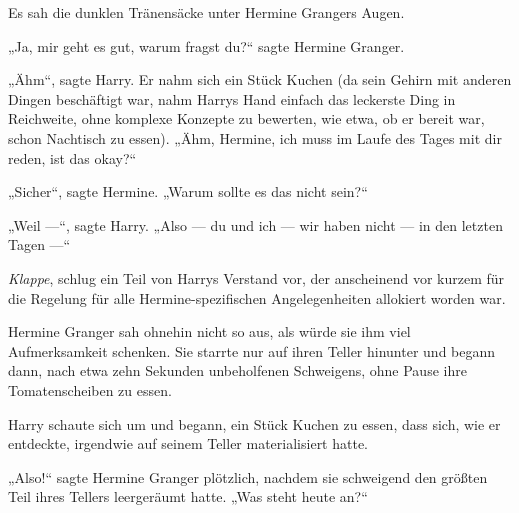 Es sah die dunklen Tränensäcke unter Hermine Grangers Augen.

„Ja, mir geht es gut, warum fragst du?“ sagte Hermine Granger.

„Ähm“, sagte Harry. Er nahm sich ein Stück Kuchen (da sein Gehirn mit anderen Dingen beschäftigt war, nahm Harrys Hand einfach das leckerste Ding in Reichweite, ohne komplexe Konzepte zu bewerten, wie etwa, ob er bereit war, schon Nachtisch zu essen). „Ähm, Hermine, ich muss im Laufe des Tages mit dir reden, ist das okay?“

„Sicher“, sagte Hermine.
„Warum sollte es das nicht sein?“

„Weil —“, sagte Harry.
„Also — du und ich — wir haben nicht — in den letzten Tagen —“

\emph{Klappe}, schlug ein Teil von Harrys Verstand vor, der anscheinend vor kurzem für die Regelung für alle Hermine-spezifischen Angelegenheiten allokiert worden war.

Hermine Granger sah ohnehin nicht so aus, als würde sie ihm viel Aufmerksamkeit schenken. Sie starrte nur auf ihren Teller hinunter und begann dann, nach etwa zehn Sekunden unbeholfenen Schweigens, ohne Pause ihre Tomatenscheiben zu essen.

Harry schaute sich um und begann, ein Stück Kuchen zu essen, dass sich, wie er entdeckte, irgendwie auf seinem Teller materialisiert hatte.

„Also!“ sagte Hermine Granger plötzlich, nachdem sie schweigend den größten Teil ihres Tellers leergeräumt hatte.
„Was steht heute an?“

